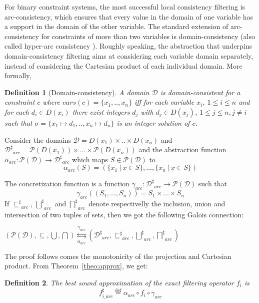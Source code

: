\documentclass[submission,copyright,creativecommons]{eptcs}
\newtheorem{definition}{Definition}
\newcommand{\Def}{\overset{\operatorname{def}}{=}}
\newcommand{\parties}[1]{\mathcal{P}(#1)}
\newcommand{\sh}[1]{\ensuremath{#1^\sharp}}
\begin{document}
For binary constraint systems, the most successful local consistency filtering is arc-consistency, 
which ensures that every value in the domain of one variable has a support in the domain of the other variable.
The standard extension of arc-consistency for constraints of more than two variables is domain-consistency (also called
hyper-arc consistency \cite{MS98}).
Roughly speaking, the abstraction that underpins domain-consistency filtering aims at considering
each variable domain separately, instead of considering the Cartesian product of each individual domain. More
formally,
\begin{definition}[Domain-consistency]
A domain $\mathcal{D}$ is domain-consistent for a constraint $c$ where $vars(c)=\{x_1,..,x_n\}$ 
iff for each variable $x_i$, $1 \leq i \leq n$ and for each $d_i \in D(x_i)$
there exist integers $d_j$ with $d_j \in D(x_j)$, $1 \leq j \leq n, j \neq i$
such that $\sigma = \{x_1 \mapsto d_1, ..,x_n \mapsto d_n\}$ is an integer solution of $c$.
\end{definition} 
\noindent
Consider the domains $\mathcal{D}=D(x_1) \times .. \times D(x_n)$ and  
$\sh{\mathcal{D}}_{arc} = \mathcal{P}(D(x_1)) \times \ldots \times \mathcal{P}(D(x_n))$ and
the abstraction function $\alpha_{arc} : \parties{\mathcal{D}} \rightarrow
\sh{\mathcal{D}}_{arc}$ which maps $S \in \parties{\mathcal{D}}$ to
$$ \alpha_{arc}(S) = (\{x_1~|~x \in S\}, \ldots, \{x_n~|~ x \in S\})$$

\noindent
The concretization function is a function $\gamma_{arc} : \sh{\mathcal{D}}_{arc} \rightarrow \parties{\mathcal{D}}$ such that
$$\gamma_{arc}((S_1,\ldots,S_n)) = S_1 \times \ldots \times S_n $$
\noindent
If $\sh{\sqsubseteq}_{arc}$, $\sh{\bigsqcup}_{arc}$ and  $\sh{\bigsqcap}_{arc}$ denote respectivelly the
inclusion, union and intersection of two tuples of sets, then we got the following Galois connection:
\begin{center}
$
(\parties{\mathcal{D}}, \subseteq, \bigcup, \bigcap) \overset{\gamma_{arc}}{\underset{\alpha_{arc}}{\leftrightarrows}} 
(\sh{\mathcal{D}}_{arc}, \sh{\sqsubseteq}_{arc}, \sh{\bigsqcup}_{arc}, \sh{\bigsqcap}_{arc})
$
\end{center}
\noindent
The proof follows comes the monotonicity of the projection and Cartesian product.
From Theorem~\ref{theo:approx}, we get:
\begin{definition}
The best sound approximation of the exact filtering operator $f_{i}$ is 
$$ \sh{f_{i\_arc}} \Def \alpha_{arc}\circ f_i \circ \gamma_{arc} $$
\end{definition}
\end{document}
